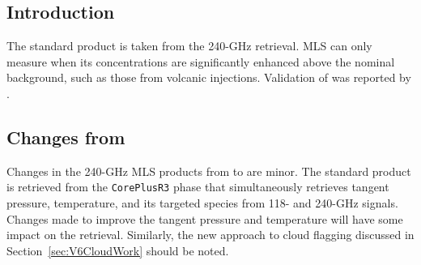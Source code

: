 
\subsection{Introduction}

The standard  product is taken from the 240\nobreakdash-GHz retrieval. MLS can only measure  when its concentrations are significantly enhanced above the nominal background, such as those from volcanic injections. Validation of \vii {} was reported by \citet{PumphreyEtal:2015}.

\subsection{Changes from \prevv}

Changes in the 240\nobreakdash-GHz MLS products from \prevv to \thisv are minor. The standard  product is retrieved from the \texttt{CorePlusR3} phase that simultaneously retrieves tangent pressure, temperature, and its targeted species from 118- and 240\nobreakdash-GHz signals. Changes made to improve the tangent pressure and temperature will have some impact on the  retrieval. Similarly, the new approach to cloud flagging discussed in Section~\ref{sec:V6CloudWork} should be noted.




